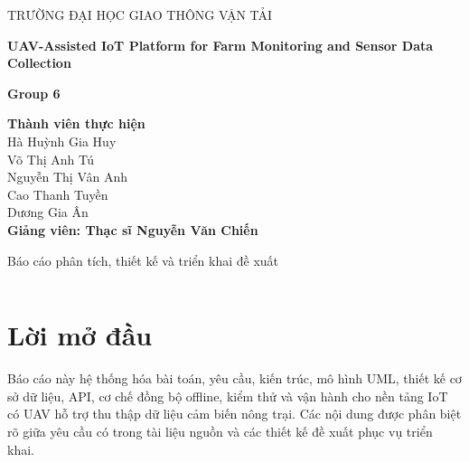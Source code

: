 \documentclass[12pt,a4paper]{report}
\newcommand{\ProjectTitle}{UAV-Assisted IoT Platform for Farm Monitoring and Sensor Data Collection}
\newcommand{\ProjectCode}{Group 6}
\begin{document}
\begin{titlepage}
{\Large\bfseries\par TRƯỜNG ĐẠI HỌC GIAO THÔNG VẬN TẢI \par}
\centering
\vspace*{0.5cm}
{\Huge\bfseries \ProjectTitle\par}
\vspace{0.8cm}
{\Large \textbf {\ProjectCode}\par}
\vspace{1.2cm}
\Large\textbf{Thành viên thực hiện}\\[0.5em]
Hà Huỳnh Gia Huy\\
Võ Thị Anh Tú\\
Nguyễn Thị Vân Anh\\
Cao Thanh Tuyền\\
Dương Gia Ân\\
\Large\textbf{Giảng viên: Thạc sĩ Nguyễn Văn Chiến}\\[0.5em]
{\Large Báo cáo phân tích, thiết kế và triển khai đề xuất\par}
\vfill
\begin{tabular}{rl}
\end{tabular}
\vfill
\end{titlepage}

\chapter*{Lời mở đầu}
Báo cáo này hệ thống hóa bài toán, yêu cầu, kiến trúc, mô hình UML, thiết kế cơ sở dữ liệu, API, cơ chế đồng bộ offline, kiểm thử và vận hành cho nền tảng IoT có UAV hỗ trợ thu thập dữ liệu cảm biến nông trại. Các nội dung được phân biệt rõ giữa yêu cầu có trong tài liệu nguồn và các thiết kế đề xuất phục vụ triển khai.
\renewcommand{\contentsname}{Mục lục}
\tableofcontents
\clearpage
{}






\appendix
\end{document}
